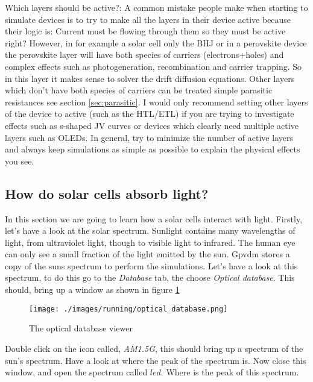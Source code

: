 


Which layers should be active?: A common mistake people make when starting to simulate devices is to try to make all the layers in their device active because their logic is: Current must be flowing through them so they must be active right?  However, in for example a solar cell only the BHJ or in a perovskite device the perovskite layer will have both species of carriers (electrons+holes) and complex effects such as photogeneration, recombination and carrier trapping. So in this layer it makes sense to solver the drift diffusion equations.  Other layers which don't have both species of carriers can be treated simple parasitic resistances see section \ref{sec:parasitic}. I would only recommend setting other layers of the device to active (such as the HTL/ETL) if you are trying to investigate effects such as s-shaped JV curves or devices which clearly need multiple active layers such as OLEDs. In general, try to minimize the number of active layers and always keep simulations as simple as possible to explain the physical effects you see.  

\newpage
\subsection{How do solar cells absorb light?}
In this section we are going to learn how a solar cells interact with light.  Firstly, let's have a look at the solar spectrum.  Sunlight contains many wavelengths of light, from ultraviolet light, though to visible light to infrared.  The human eye can only see a small fraction of the light emitted by the sun.  Gpvdm stores a copy of the suns spectrum to perform the simulations.  Let's have a look at this spectrum, to do this go to the \emph{Database} tab, the choose \emph{Optical database}.  This should, bring up a window as shown in figure \ref{fig:optical_database}

\begin{figure}[h!]
\centering
\texttt{[image: ./images/running/optical\_database.png]}
\caption{The optical database viewer}
\label{fig:optical_database}
\end{figure}

Double click on the icon called, \emph{AM1.5G}, this should bring up a spectrum of the sun's spectrum.  Have a look at where the peak of the spectrum is.  Now close this window, and open the spectrum called $led$.  Where is the peak of this spectrum.



